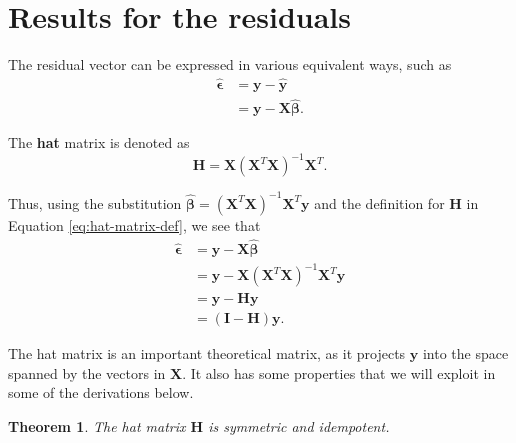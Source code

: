 \documentclass[
]{book}
\newtheorem{theorem}{Theorem}[chapter]
\theoremstyle{definition}
\theoremstyle{definition}
\theoremstyle{definition}
\theoremstyle{definition}
\theoremstyle{remark}
\begin{document}
\hypertarget{results-for-the-residuals}{%
\section{Results for the residuals}\label{results-for-the-residuals}}

The residual vector can be expressed in various equivalent ways, such as
\[
\begin{aligned}
\hat{\boldsymbol{\epsilon}} &= \mathbf{y}-\hat{\mathbf{y}} \\
&= \mathbf{y}-\mathbf{X}\hat{\boldsymbol{\beta}}.
\end{aligned}
\]

The \textbf{hat} matrix is denoted as
\[
\mathbf{H}=\mathbf{X}(\mathbf{X}^T\mathbf{X})^{-1}\mathbf{X}^T.\label{eq:hat-matrix-def}
\]

Thus, using the substitution \(\hat{\boldsymbol{\beta}}=(\mathbf{X}^T\mathbf{X})^{-1}\mathbf{X}^T\mathbf{y}\) and the definition for \(\mathbf{H}\) in Equation \eqref{eq:hat-matrix-def}, we see that
\[
\begin{aligned}
\hat{\boldsymbol{\epsilon}} &= \mathbf{y}-\mathbf{X}\hat{\boldsymbol{\beta}} \\ 
&= \mathbf{y} - \mathbf{X}(\mathbf{X}^T\mathbf{X})^{-1}\mathbf{X}^T\mathbf{y} \\
&= \mathbf{y} - \mathbf{H}\mathbf{y} \\
&= (\mathbf{I}-\mathbf{H})\mathbf{y}.
\end{aligned}
\]

The hat matrix is an important theoretical matrix, as it projects \(\mathbf{y}\) into the space spanned by the vectors in \(\mathbf{X}\). It also has some properties that we will exploit in some of the derivations below.

\begin{theorem}
\protect\hypertarget{thm:h-properties}{}\label{thm:h-properties}The hat matrix \(\mathbf{H}\) is symmetric and idempotent.
\end{theorem}
\end{document}
